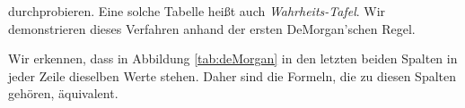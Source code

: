 durchprobieren.  Eine solche Tabelle hei\ss{}t auch \emph{Wahrheits-Tafel}.
Wir demonstrieren dieses Verfahren anhand der ersten DeMorgan'schen Regel.
\begin{table}[!ht]
  \centering
{}
  \caption{Nachweis der ersten DeMorgan'schen Regel.}
  \label{tab:deMorgan}
\end{table}
Wir erkennen, dass in Abbildung \ref{tab:deMorgan} in den letzten beiden Spalten in jeder Zeile dieselben Werte
stehen.  Daher sind die Formeln, die zu diesen Spalten geh\"{o}ren, \"{a}quivalent.

